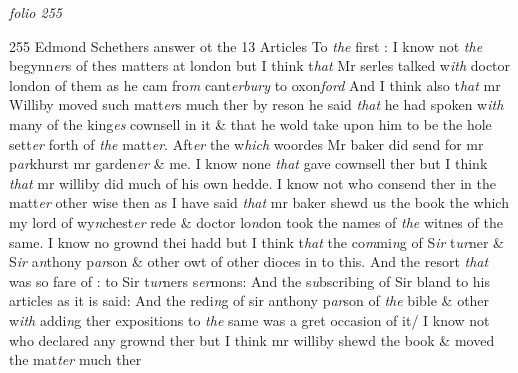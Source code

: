 \documentclass[12pt, a4paper]{book}
\begin{document}
\textit{folio 255}



{\color{Mahogany}255} Edmond Schethers answer ot the 13 Articles To \textit{the} first : I know not \textit{the} begynn\textit{er}s of thes matters at london but I think 
				\marginpar[\vspace{0.5cm}{\textcolor{Gray}{1}}]{}
			 t\textit{hat} Mr serles talked w\textit{ith} doctor london of them as he cam fro\textit{m} cant\textit{erbury} to oxon\textit{ford} And 
				\marginpar[\vspace{0.5cm}{\textcolor{Gray}{D willoughby}}]{}
			 I think also t\textit{hat} mr Williby moved such matt\textit{er}s much ther by reson he said \textit{that} he had spoken w\textit{ith }many of the king\textit{es} cownsell in it \& that he wold take upon him to be the hole sett\textit{er} forth of \textit{the} matt\textit{er}. Aft\textit{er }the w\textit{hich} woordes Mr baker did  send for mr p\textit{ar}khurst mr garden\textit{er} \& me.  
				\marginpar[\vspace{0.5cm}{\textcolor{Gray}{2}}]{}
			 I know none \textit{that} gave cownsell ther but I think \textit{that} mr williby did much of his own hedde. 
				\marginpar[\vspace{0.5cm}{\textcolor{Gray}{3}}]{}
			 I know not who consend ther in the matt\textit{er} other wise then as I have said \textit{that} 
				\marginpar[\vspace{0.5cm}{\textcolor{Gray}{Mr Baker vintomen D. london}}]{}
			 mr baker shewd us the book the which my lord of wy\textit{n}chest\textit{er} rede \& doctor lo\textit{n}don took the names of \textit{the} witnes of the same. I know no grownd thei hadd but I think t\textit{hat }the co\textit{m}mi\textit{n}g of S\textit{ir} t\textit{ur}ner \& S\textit{ir }a\textit{n}thony 
				\marginpar[\vspace{0.5cm}{\textcolor{Gray}{4}}]{}
			 p\textit{ar}son \& other owt of other dioces in to this. And the resort \textit{that} was so fare of : to Sir t\textit{ur}ners s\textit{er}mons: And the s\textit{u}bscribing of Sir bland to his articles as it  is said: And the redi\textit{n}g of sir anthony p\textit{ar}son of \textit{the} bible \& other w\textit{ith} addi\textit{n}g ther expositions to \textit{the} same was a gret occasion of it/ 
				\marginpar[\vspace{0.5cm}{\textcolor{Gray}{5}}]{}
			 I know not who declared any grownd ther but I think mr williby shewd the book \& moved the mat\textit{ter} much ther 
				\marginpar[\vspace{0.5cm}{\textcolor{Gray}{n 6}}]{}
\end{document}
